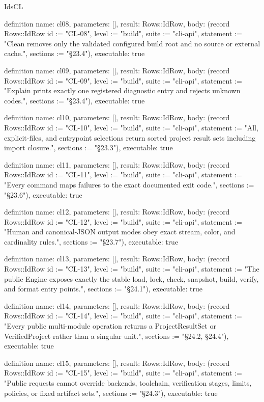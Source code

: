 \begin{lexlean}{IdsCL}
\begin{semanticmodule}
definition{
  name: cl08,
  parameters: [],
  result: Rows::IdRow,
  body: (record Rows::IdRow {id := "CL-08", level := "build", suite := "cli-api", statement := "Clean removes only the validated configured build root and no source or external cache.", sections := "§23.4"}),
  executable: true
}

definition{
  name: cl09,
  parameters: [],
  result: Rows::IdRow,
  body: (record Rows::IdRow {id := "CL-09", level := "build", suite := "cli-api", statement := "Explain prints exactly one registered diagnostic entry and rejects unknown codes.", sections := "§23.4"}),
  executable: true
}

definition{
  name: cl10,
  parameters: [],
  result: Rows::IdRow,
  body: (record Rows::IdRow {id := "CL-10", level := "build", suite := "cli-api", statement := "All, explicit-files, and entrypoint selections return sorted project result sets including import closure.", sections := "§23.3"}),
  executable: true
}

definition{
  name: cl11,
  parameters: [],
  result: Rows::IdRow,
  body: (record Rows::IdRow {id := "CL-11", level := "build", suite := "cli-api", statement := "Every command maps failures to the exact documented exit code.", sections := "§23.6"}),
  executable: true
}

definition{
  name: cl12,
  parameters: [],
  result: Rows::IdRow,
  body: (record Rows::IdRow {id := "CL-12", level := "build", suite := "cli-api", statement := "Human and canonical-JSON output modes obey exact stream, color, and cardinality rules.", sections := "§23.7"}),
  executable: true
}

definition{
  name: cl13,
  parameters: [],
  result: Rows::IdRow,
  body: (record Rows::IdRow {id := "CL-13", level := "build", suite := "cli-api", statement := "The public Engine exposes exactly the stable load, lock, check, snapshot, build, verify, and format entry points.", sections := "§24.1"}),
  executable: true
}

definition{
  name: cl14,
  parameters: [],
  result: Rows::IdRow,
  body: (record Rows::IdRow {id := "CL-14", level := "build", suite := "cli-api", statement := "Every public multi-module operation returns a ProjectResultSet or VerifiedProject rather than a singular unit.", sections := "§24.2, §24.4"}),
  executable: true
}

definition{
  name: cl15,
  parameters: [],
  result: Rows::IdRow,
  body: (record Rows::IdRow {id := "CL-15", level := "build", suite := "cli-api", statement := "Public requests cannot override backends, toolchain, verification stages, limits, policies, or fixed artifact sets.", sections := "§24.3"}),
  executable: true
}


\end{semanticmodule}
\end{lexlean}
